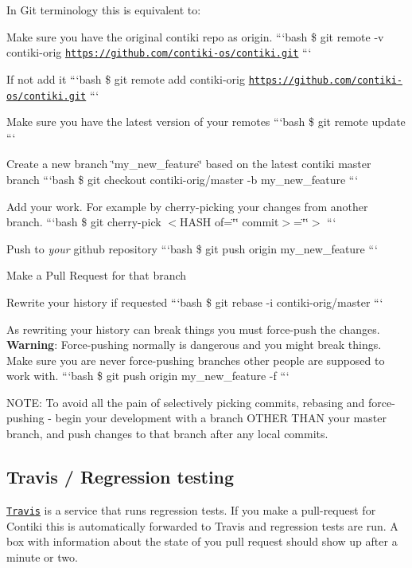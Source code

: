 In Git terminology this is equivalent to\+:
\begin{DoxyItemize}
\item Make sure you have the original contiki repo as origin. ```bash \$ git remote -\/v contiki-\/orig \href{https://github.com/contiki-os/contiki.git}{\tt https\+://github.\+com/contiki-\/os/contiki.\+git} ```
\item If not add it ```bash \$ git remote add contiki-\/orig \href{https://github.com/contiki-os/contiki.git}{\tt https\+://github.\+com/contiki-\/os/contiki.\+git} ```
\item Make sure you have the latest version of your remotes ```bash \$ git remote update ```
\item Create a new branch \char`\"{}my\+\_\+new\+\_\+feature\char`\"{} based on the latest contiki master branch ```bash \$ git checkout contiki-\/orig/master -\/b my\+\_\+new\+\_\+feature ```
\item Add your work. For example by cherry-\/picking your changes from another branch. ```bash \$ git cherry-\/pick $<$\+H\+A\+S\+H of=\char`\"{}\char`\"{} commit$>$=\char`\"{}\char`\"{}$>$ ```
\item Push to {\itshape your} github repository ```bash \$ git push origin my\+\_\+new\+\_\+feature ```
\item Make a Pull Request for that branch
\item Rewrite your history if requested ```bash \$ git rebase -\/i contiki-\/orig/master ```
\item As rewriting your history can break things you must force-\/push the changes. {\bfseries Warning}\+: Force-\/pushing normally is dangerous and you might break things. Make sure you are never force-\/pushing branches other people are supposed to work with. ```bash \$ git push origin my\+\_\+new\+\_\+feature -\/f ```
\item N\+O\+T\+E\+: To avoid all the pain of selectively picking commits, rebasing and force-\/pushing -\/ begin your development with a branch O\+T\+H\+E\+R T\+H\+A\+N your master branch, and push changes to that branch after any local commits.
\end{DoxyItemize}

\subsection*{Travis / Regression testing }

\href{https://travis-ci.org/}{\tt Travis} is a service that runs regression tests. If you make a pull-\/request for Contiki this is automatically forwarded to Travis and regression tests are run. A box with information about the state of you pull request should show up after a minute or two.

